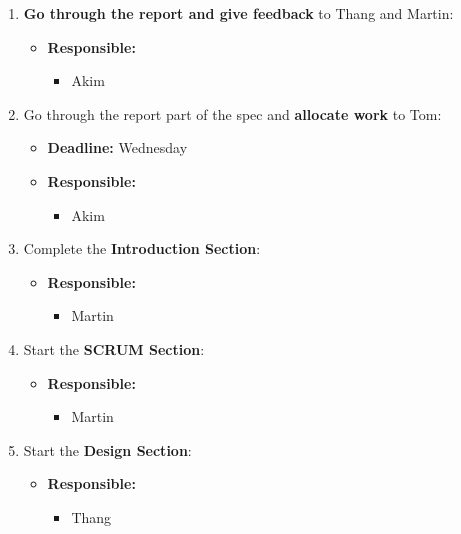 \documentclass[11pt]{article}
\begin{document}
\begin{enumerate}
\def\labelenumi{\arabic{enumi}.}
\setcounter{enumi}{6}
\tightlist
\item
  \textbf{Go through the report and give feedback} to Thang and Martin:

  \begin{itemize}
  \tightlist
  \item
    \textbf{Responsible:}

    \begin{itemize}
    \tightlist
    \item
      Akim
    \end{itemize}
  \end{itemize}
\item
  Go through the report part of the spec and \textbf{allocate work} to
  Tom:

  \begin{itemize}
  \tightlist
  \item
    \textbf{Deadline:} Wednesday
  \item
    \textbf{Responsible:}

    \begin{itemize}
    \tightlist
    \item
      Akim
    \end{itemize}
  \end{itemize}
\item
  Complete the \textbf{Introduction Section}:

  \begin{itemize}
  \tightlist
  \item
    \textbf{Responsible:}

    \begin{itemize}
    \tightlist
    \item
      Martin
    \end{itemize}
  \end{itemize}
\item
  Start the \textbf{SCRUM Section}:

  \begin{itemize}
  \tightlist
  \item
    \textbf{Responsible:}

    \begin{itemize}
    \tightlist
    \item
      Martin
    \end{itemize}
  \end{itemize}
\item
  Start the \textbf{Design Section}:

  \begin{itemize}
  \tightlist
  \item
    \textbf{Responsible:}

    \begin{itemize}
    \tightlist
    \item
      Thang
    \end{itemize}
  \end{itemize}
\end{enumerate}
\end{document}
